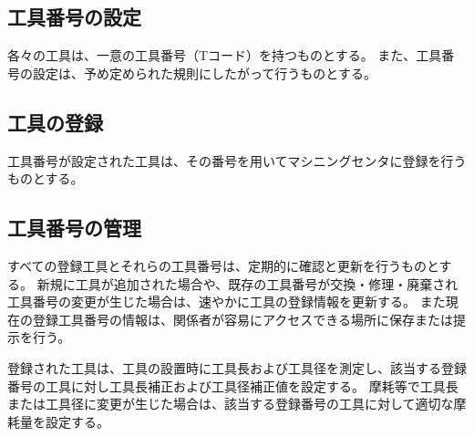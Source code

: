 



\subsection{工具番号の設定}
各々の工具は、一意の工具番号（Tコード）を持つものとする。
また、工具番号の設定は、予め定められた規則にしたがって行うものとする。

\subsection{工具の登録}
工具番号が設定された工具は、その番号を用いてマシニングセンタに登録を行うものとする。

\subsection{工具番号の管理}
すべての登録工具とそれらの工具番号は、定期的に確認と更新を行うものとする。
新規に工具が追加された場合や、既存の工具番号が交換・修理・廃棄され工具番号の変更が生じた場合は、速やかに工具の登録情報を更新する。
また現在の登録工具番号の情報は、関係者が容易にアクセスできる場所に保存または提示を行う。


登録された工具は、工具の設置時に工具長および工具径を測定し、該当する登録番号の工具に対し工具長補正および工具径補正値を設定する。
摩耗等で工具長または工具径に変更が生じた場合は、該当する登録番号の工具に対して適切な摩耗量を設定する。

